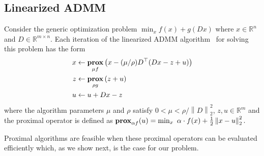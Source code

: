 \documentclass{article}
\newcommand{\norm}[1]{\left\lVert #1 \right\rVert}
\DeclareMathOperator*{\prox}{\bf prox}
\begin{document}
\subsection{Linearized ADMM}
\label{sec:linADMM}


Consider the generic optimization problem
$\min_x f(x)+g(Dx)$
where $x\in \mathbb{R}^n$ and $D\in \mathbb{R}^{m\times n}$. Each
iteration of the linearized ADMM
algorithm~\citep{parikh_proximal_2014} for solving this problem 
has the form
\begin{align}
x & \leftarrow \prox_{\mu f} \left(x - (\mu/\rho)D^\top (D x - z + u )\right)\\
z & \leftarrow \prox_{\rho g} \left(z + u\right) \label{eq:linADMM_steps}\\
u & \leftarrow u + D x - z
\end{align}
where the algorithm parameters $\mu$ and $\rho$ satisfy $0 < \mu < \rho/\norm{D}_2^2$, $z,u\in \mathbb{R}^m$ and the proximal operator is defined as
$
 \prox_{\alpha f}(u) = \min_x \,\, \alpha \cdot f(x)+\frac{1}{2} \norm{ x-u}_2^2.
$

Proximal
algorithms are feasible when these proximal operators can be
evaluated efficiently which, as we show next, is the case for our
problem.  
\end{document}
